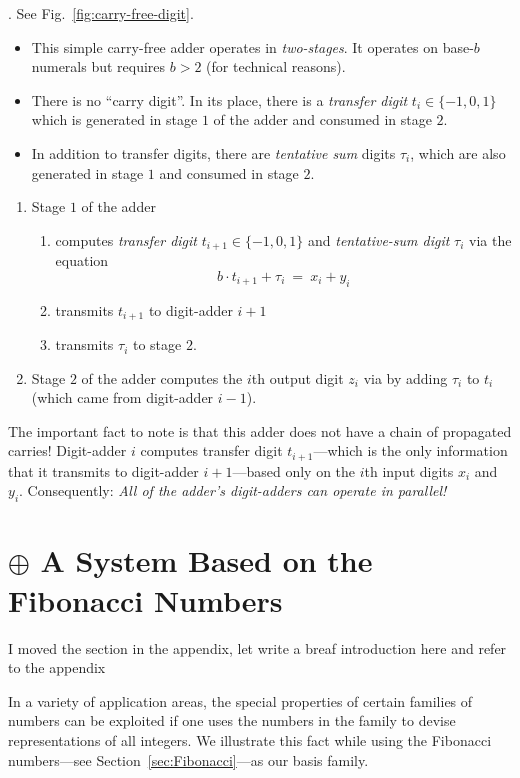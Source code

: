 . 
See Fig.~\ref{fig:carry-free-digit}.
\begin{itemize}
\item
This simple carry-free adder operates in {\em two-stages}.  It
operates on base-$b$ numerals but requires $b > 2$ (for technical
reasons).
\item
There is no ``carry digit''.  In its place, there is a {\it transfer
  digit} $t_i \in \{-1, 0, 1\}$ 
 which is generated in stage
$1$ of the adder and consumed in stage $2$.
\item
In addition to transfer digits, there are {\it tentative sum} digits
$\tau_i$,  
which are also generated in stage $1$ and consumed in stage $2$.
\end{itemize}
\begin{enumerate}
\item
Stage $1$ of the adder
\begin{enumerate}
\item
computes {\it transfer digit} $t_{i+1} \in \{-1, 0 , 1\}$ and {\it
  tentative-sum digit} $\tau_i$ via the equation
\[ b \cdot t_{i+1} + \tau_i \ = \ x_i + y_i \]
\item
transmits $t_{i+1}$ to digit-adder $i+1$
\item
transmits $\tau_i$ to stage $2$.
\end{enumerate}
\item
Stage $2$ of the adder computes the $i$th output digit $z_i$ via by
adding $\tau_i$ to $t_i$ (which came from digit-adder $i-1$).
\end{enumerate}
The important fact to note is that this adder does not have a chain of
propagated carries!  Digit-adder $i$ computes transfer digit
$t_{i+1}$---which is the only information that it transmits to
digit-adder $i+1$---based only on the $i$th input digits $x_i$ and
$y_i$.  Consequently: {\em All of the adder's digit-adders can operate
  in parallel!}



\section{$\oplus$ A System Based on the Fibonacci Numbers}

{\Denis I moved the section in the appendix, let write a breaf introduction here and refer to the appendix
}


In a variety of application areas, the special properties of certain
families of numbers can be exploited if one uses the numbers in the
family to devise representations of all integers.  We illustrate this
fact while using the Fibonacci numbers---see
Section~\ref{sec:Fibonacci}---as our basis family.



